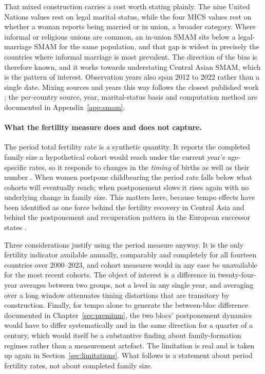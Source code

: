 That mixed construction carries a cost worth stating plainly. The nine United Nations values rest on legal marital status, while the four MICS values rest on whether a woman reports being married or in union, a broader category. Where informal or religious unions are common, an in-union SMAM sits below a legal-marriage SMAM for the same population, and that gap is widest in precisely the countries where informal marriage is most prevalent. The direction of the bias is therefore known, and it works towards understating Central Asian SMAM, which is the pattern of interest. Observation years also span 2012 to 2022 rather than a single date. Mixing sources and years this way follows the closest published work \parencite{dommaraju2008,spoorenberg2013,kumo2024}; the per-country source, year, marital-status basis and computation method are documented in Appendix~\ref{app:smam}.

\paragraph{What the fertility measure does and does not capture.} The period total fertility rate is a synthetic quantity. It reports the completed family size a hypothetical cohort would reach under the current year's age-specific rates, so it responds to changes in the \emph{timing} of births as well as their number \parencite{bongaarts1998}. When women postpone childbearing the period rate falls below what cohorts will eventually reach; when postponement slows it rises again with no underlying change in family size. This matters here, because tempo effects have been identified as one force behind the fertility recovery in Central Asia \parencite{spoorenberg2015} and behind the postponement and recuperation pattern in the European successor states \parencite{grigoras2019}.

Three considerations justify using the period measure anyway. It is the only fertility indicator available annually, comparably and completely for all fourteen countries over 2000--2023, and cohort measures would in any case be unavailable for the most recent cohorts. The object of interest is a difference in twenty-four-year averages between two groups, not a level in any single year, and averaging over a long window attenuates timing distortions that are transitory by construction. Finally, for tempo alone to generate the between-bloc difference documented in Chapter~\ref{sec:premium}, the two blocs' postponement dynamics would have to differ systematically and in the same direction for a quarter of a century, which would itself be a substantive finding about family-formation regimes rather than a measurement artefact. The limitation is real and is taken up again in Section~\ref{sec:limitations}. What follows is a statement about period fertility rates, not about completed family size.

